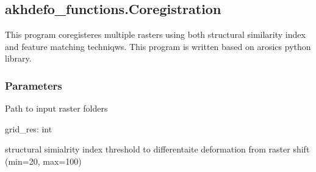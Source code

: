 \documentclass[letterpaper,10pt]{sphinxmanual}
\begin{document}
\subsection{akhdefo\_functions.Coregistration}
\label{\detokenize{generated/akhdefo_functions.Coregistration:akhdefo-functions-coregistration}}\label{\detokenize{generated/akhdefo_functions.Coregistration::doc}}

\begin{fulllineitems}
\label{\detokenize{generated/akhdefo_functions.Coregistration:akhdefo_functions.Coregistration}}
\pysigstartsignatures
{}
\pysigstopsignatures
\sphinxAtStartPar
This program coregisteres multiple rasters using both structural similarity index and feature matching techniqws.
This program is written based on arosics python library.


\subsubsection{Parameters}
\label{\detokenize{generated/akhdefo_functions.Coregistration:parameters}}\begin{description}
\sphinxAtStartPar
Path to input raster folders

\end{description}

\sphinxAtStartPar
grid\_res: int
\begin{description}
\sphinxAtStartPar
structural simialrity index threshold to differentaite deformation from raster shift (min=20, max=100)


\end{description}
\end{fulllineitems}
\end{document}
